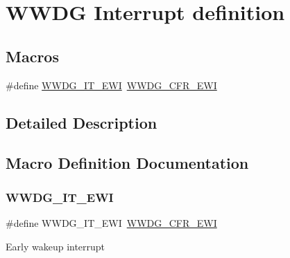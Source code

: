 \hypertarget{group___w_w_d_g___interrupt__definition}{}\section{W\+W\+DG Interrupt definition}
\label{group___w_w_d_g___interrupt__definition}
\subsection*{Macros}
\begin{DoxyCompactItemize}
\item 
\#define \hyperlink{group___w_w_d_g___interrupt__definition_gaf2659a7ce6e4edd7c6d1b537dbc33362}{W\+W\+D\+G\+\_\+\+I\+T\+\_\+\+E\+WI}~\hyperlink{group___peripheral___registers___bits___definition_ga931941dc5d795502371ac5dd8fbac1e9}{W\+W\+D\+G\+\_\+\+C\+F\+R\+\_\+\+E\+WI}
\end{DoxyCompactItemize}


\subsection{Detailed Description}


\subsection{Macro Definition Documentation}
\mbox{\label{group___w_w_d_g___interrupt__definition_gaf2659a7ce6e4edd7c6d1b537dbc33362}} 
\subsubsection{\texorpdfstring{W\+W\+D\+G\+\_\+\+I\+T\+\_\+\+E\+WI}{WWDG\_IT\_EWI}}
{\footnotesize\ttfamily \#define W\+W\+D\+G\+\_\+\+I\+T\+\_\+\+E\+WI~\hyperlink{group___peripheral___registers___bits___definition_ga931941dc5d795502371ac5dd8fbac1e9}{W\+W\+D\+G\+\_\+\+C\+F\+R\+\_\+\+E\+WI}}

Early wakeup interrupt 